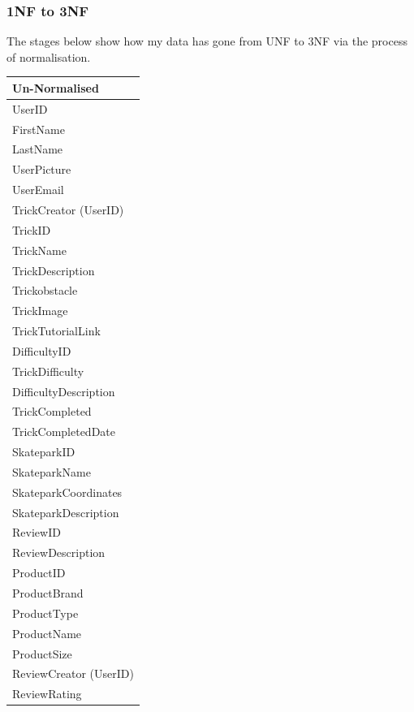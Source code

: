 \subsubsection{1NF to 3NF}

The stages below show how my data has gone from UNF to 3NF via the process of normalisation. 



\begin{center}


\begin{tabular}{|p{4cm}|}  \hline
\textbf{Un-Normalised} \\ \hline
UserID \\ 
FirstName \\
LastName \\ 
UserPicture \\
UserEmail \\
TrickCreator (UserID) \\
TrickID \\ 
TrickName \\ 
TrickDescription \\
Trickobstacle \\
TrickImage \\
TrickTutorialLink \\
DifficultyID \\
TrickDifficulty \\
DifficultyDescription \\
TrickCompleted \\
TrickCompletedDate \\
SkateparkID \\
SkateparkName \\ 
SkateparkCoordinates \\
SkateparkDescription \\
ReviewID \\
ReviewDescription \\
ProductID \\
ProductBrand \\
ProductType \\
ProductName \\
ProductSize \\
ReviewCreator (UserID) \\
ReviewRating \\ \hline 

\end{tabular}
\label{tab:Un-Normalised Database}
\end{center}


